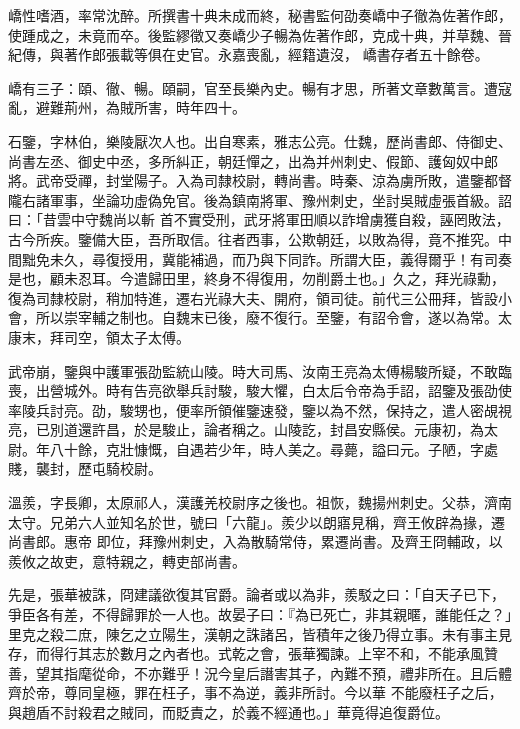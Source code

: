 \begin{pinyinscope}
 嶠性嗜酒，率常沈醉。所撰書十典未成而終，秘書監何劭奏嶠中子徹為佐著作郎，使踵成之，未竟而卒。後監繆徵又奏嶠少子暢為佐著作郎，克成十典，并草魏、晉紀傳，與著作郎張載等俱在史官。永嘉喪亂，經籍遺沒，
 嶠書存者五十餘卷。



 嶠有三子：頤、徹、暢。頤嗣，官至長樂內史。暢有才思，所著文章數萬言。遭寇亂，避難荊州，為賊所害，時年四十。



 石鑒，字林伯，樂陵厭次人也。出自寒素，雅志公亮。仕魏，歷尚書郎、侍御史、尚書左丞、御史中丞，多所糾正，朝廷憚之，出為并州刺史、假節、護匈奴中郎將。武帝受禪，封堂陽子。入為司隸校尉，轉尚書。時秦、涼為虜所敗，遣鑒都督隴右諸軍事，坐論功虛偽免官。後為鎮南將軍、豫州刺史，坐討吳賊虛張首級。詔曰：「昔雲中守魏尚以斬
 首不實受刑，武牙將軍田順以詐增虜獲自殺，誣罔敗法，古今所疾。鑒備大臣，吾所取信。往者西事，公欺朝廷，以敗為得，竟不推究。中間黜免未久，尋復授用，冀能補過，而乃與下同詐。所謂大臣，義得爾乎！有司奏是也，顧未忍耳。今遣歸田里，終身不得復用，勿削爵土也。」久之，拜光祿勳，復為司隸校尉，稍加特進，遷右光祿大夫、開府，領司徒。前代三公冊拜，皆設小會，所以崇宰輔之制也。自魏末已後，廢不復行。至鑒，有詔令會，遂以為常。太康末，拜司空，領太子太傅。



 武帝崩，鑒與中護軍張劭監統山陵。時大司馬、汝南王亮為太傅楊駿所疑，不敢臨
 喪，出營城外。時有告亮欲舉兵討駿，駿大懼，白太后令帝為手詔，詔鑒及張劭使率陵兵討亮。劭，駿甥也，便率所領催鑒速發，鑒以為不然，保持之，遣人密覘視亮，已別道還許昌，於是駿止，論者稱之。山陵訖，封昌安縣侯。元康初，為太尉。年八十餘，克壯慷慨，自遇若少年，時人美之。尋薨，謚曰元。子陋，字處賤，襲封，歷屯騎校尉。



 溫羨，字長卿，太原祁人，漢護羌校尉序之後也。祖恢，魏揚州刺史。父恭，濟南太守。兄弟六人並知名於世，號曰「六龍」。羨少以朗寤見稱，齊王攸辟為掾，遷尚書郎。惠帝
 即位，拜豫州刺史，入為散騎常侍，累遷尚書。及齊王冏輔政，以羨攸之故吏，意特親之，轉吏部尚書。



 先是，張華被誅，冏建議欲復其官爵。論者或以為非，羨駁之曰：「自天子已下，爭臣各有差，不得歸罪於一人也。故晏子曰：『為已死亡，非其親暱，誰能任之？」里克之殺二庶，陳乞之立陽生，漢朝之誅諸呂，皆積年之後乃得立事。未有事主見存，而得行其志於數月之內者也。式乾之會，張華獨諫。上宰不和，不能承風贊善，望其指麾從命，不亦難乎！況今皇后譖害其子，內難不預，禮非所在。且后體齊於帝，尊同皇極，罪在枉子，事不為逆，義非所討。今以華
 不能廢枉子之后，與趙盾不討殺君之賊同，而貶責之，於義不經通也。」華竟得追復爵位。




\end{pinyinscope}
